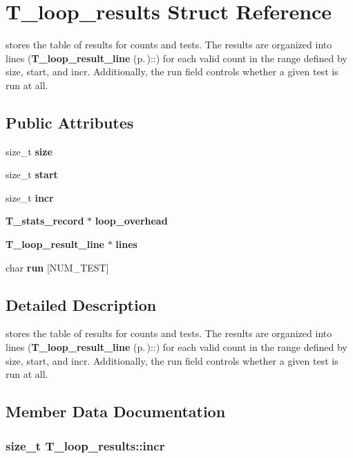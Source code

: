 \section{T\_\-loop\_\-results Struct Reference}
\label{structT__loop__results}
stores the table of results for counts and tests. The results are organized into lines ({\bf T\_\-loop\_\-result\_\-line} {\rm (p.\,\pageref{structT__loop__result__line})}::) for each valid count in the range defined by size, start, and incr. Additionally, the run field controls whether a given test is run at all. 


\subsection*{Public Attributes}
\begin{CompactItemize}
\item 
size\_\-t {\bf size}
\item 
size\_\-t {\bf start}
\item 
size\_\-t {\bf incr}
\item 
{\bf T\_\-stats\_\-record} $\ast$ {\bf loop\_\-overhead}
\item 
{\bf T\_\-loop\_\-result\_\-line} $\ast$ {\bf lines}
\item 
char {\bf run} [NUM\_\-TEST]
\end{CompactItemize}


\subsection{Detailed Description}
stores the table of results for counts and tests. The results are organized into lines ({\bf T\_\-loop\_\-result\_\-line} {\rm (p.\,\pageref{structT__loop__result__line})}::) for each valid count in the range defined by size, start, and incr. Additionally, the run field controls whether a given test is run at all.



\subsection{Member Data Documentation}
\subsubsection{\setlength{\rightskip}{0pt plus 5cm}size\_\-t T\_\-loop\_\-results::incr}\label{structT__loop__results_m2}


